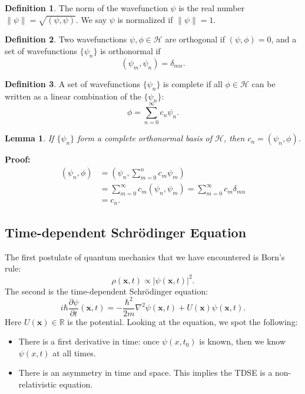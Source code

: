 \documentclass[12pt]{article}
\newtheorem{lemma}{Lemma}[section]
\theoremstyle{definition}
\newtheorem{definition}{Definition}[section]
\theoremstyle{remark}
\begin{document}
\begin{definition}
	The norm of the wavefunction $\psi$ is the real number $\|\psi\| = \sqrt{(\psi, \psi)}$. We say $\psi$ is normalized if $\|\psi\| = 1$.
\end{definition}

\begin{definition}
	Two wavefunctions $\psi, \phi \in \mathcal{H}$ are orthogonal if $(\psi, \phi) = 0$, and a set of wavefunctions $\{\psi_n\}$ is orthonormal if
	\[
		(\psi_m, \psi_n) = \delta_{mn}
	.\]
\end{definition}

\begin{definition}
	A set of wavefunctions $\{\psi_n\}$ is complete if all $\phi \in \mathcal{H}$ can be written as a linear combination of the $\{\psi_n\}$:
	\[
	\phi = \sum_{n = 0}^{\infty}c_n \psi_n
	.\]
\end{definition}

\begin{lemma}
	If $\{\psi_n\}$ form a complete orthonormal basis of $\mathcal{H}$, then $c_n = (\psi_n, \phi)$.
\end{lemma}

\begin{adjustbox}{minipage = \columnwidth - 25.5pt, margin=1em, frame=1pt, margin=0em}
\textbf{Proof:}
\begin{align*}
	(\psi_n, \phi) &= \left( \psi_n, \sum_{m = 0}^{n} c_m \psi_m \right) \\
		       &= \sum_{m = 0}^{\infty} c_m (\psi_n, \psi_m) = \sum_{m = 0}^{\infty} c_m \delta_{mn} \\
		       &= c_n.
\end{align*}
\end{adjustbox}

\subsection{Time-dependent Schr\"{o}dinger Equation}%
\label{sub:time_dependent_schrodinger_equation}

The first postulate of quantum mechanics that we have encountered is Born's rule:
\[
	\rho(\mathbf{x}, t) \propto |\psi(\mathbf{x}, t)|^2
.\]
The second is the time-dependent Schr\"{o}dinger equation:
\[
	i \hbar \frac{\partial \psi}{\partial t} (\mathbf{x}, t) = - \frac{\hbar^2}{2m} \nabla^2 \psi(\mathbf{x}, t) + U(\mathbf{x}) \psi(\mathbf{x}, t)
.\] 
Here $U(\mathbf{x}) \in \mathbb{R}$ is the potential. Looking at the equation, we spot the following:
\begin{itemize}
	\item There is a first derivative in time: once $\psi(x, t_0)$ is known, then we know $\psi(x, t)$ at all times.
	\item There is an asymmetry in time and space. This implies the TDSE is a non-relativistic equation.
\end{itemize}
\end{document}
